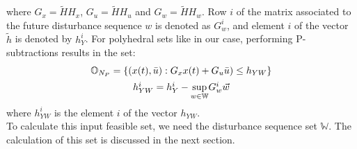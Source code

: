 \documentclass[letterpaper, 10 pt, conference]{ieeeconf}  %
\begin{document}
  where $G_x=\tilde{H}H_x$, $G_u=\tilde{H}H_u$ and $G_w=\tilde{H}H_w$.
  Row $i$ of the matrix associated to the future disturbance sequence $w$ is denoted as $G^i_w$, and element $i$ of the vector $\tilde{h}$ is denoted by $h_Y^i$.
   For polyhedral sets like in our case, performing P-subtractions results in the set:
  \begin{equation}
  \begin{matrix}
  \mathbb{O}_{N_P} = \{ (x(t),\bar{u}):G_xx(t)+G_u\bar{u})\leq h_{YW} \} \vspace{5pt} \\ 
  h_{YW}^i = h_Y^i-\underset{w\in \mathbb{W}}{\text{sup}} G_w^i \vec{w}
  \end{matrix}
  \label{overall}
  \end{equation}
  where $h_{YW}^i$ is the element $i$ of the vector $h_{YW}$.
  \\
  To calculate this input feasible set, we need the disturbance sequence set $\mathbb{W}$. The calculation of this set is discussed in the next section.
\end{document}
